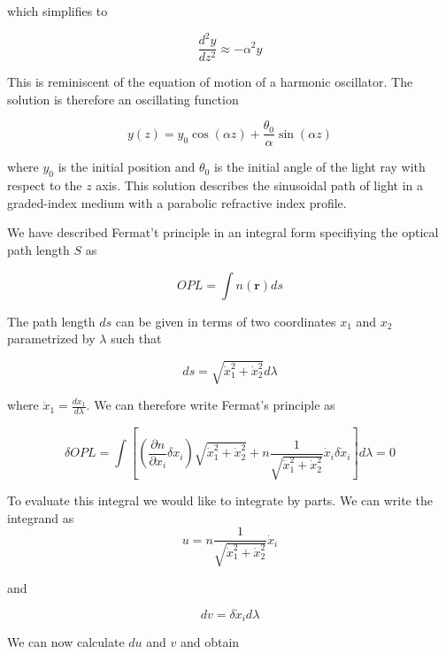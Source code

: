 \documentclass[
  a4paper,
]{book}
\begin{document}
\begin{tcolorbox}
which simplifies to

\[
\frac{d^2 y}{dz^2} \approx -\alpha^2 y
\]

This is reminiscent of the equation of motion of a harmonic oscillator.
The solution is therefore an oscillating function

\[
y(z)=y_0\cos(\alpha z)+\frac{\theta_0}{\alpha}\sin(\alpha z)
\]

where \(y_0\) is the initial position and \(\theta_0\) is the initial
angle of the light ray with respect to the \(z\) axis. This solution
describes the sinusoidal path of light in a graded-index medium with a
parabolic refractive index profile.

\end{tcolorbox}

\begin{tcolorbox}[enhanced jigsaw, breakable, toptitle=1mm, bottomrule=.15mm, colbacktitle=quarto-callout-tip-color!10!white, title=\textcolor{quarto-callout-tip-color}{\faLightbulb}\hspace{0.5em}{Fermat's Principle in Integral and Differential Form}, arc=.35mm, rightrule=.15mm, bottomtitle=1mm, opacityback=0, toprule=.15mm, coltitle=black, leftrule=.75mm, opacitybacktitle=0.6, colback=white, left=2mm, titlerule=0mm, colframe=quarto-callout-tip-color-frame]

We have described Fermat't principle in an integral form specifiying the
optical path length \(S\) as

\[
OPL=\int n(\textbf{r})ds
\]

The path length \(ds\) can be given in terms of two coordinates \(x_1\)
and \(x_2\) parametrized by \(\lambda\) such that

\[
ds=\sqrt{\dot{x}_1^{2}+\dot{x}_2^{2}}d\lambda
\]

where \(\dot{x}_1=\frac{dx_{1}}{d\lambda}\). We can therefore write
Fermat's principle as

\[
\delta OPL=\int\left[\left(\frac{\partial n}{\partial x_i} \delta x_i\right) \sqrt{\dot{x}_1^2+\dot{x}_2^2}+n \frac{1}{\sqrt{\dot{x}_1^2+\dot{x}_2^2}} \dot{x}_i \delta \dot{x}_i\right] d \lambda = 0
\]

To evaluate this integral we would like to integrate by parts. We can
write the integrand as \[
u = n \frac{1}{\sqrt{\dot{x}_1^2+\dot{x}_2^2}} \dot{x}_i
\]

and

\[
dv = \delta \dot{x}_i d\lambda
\]

We can now calculate \(du\) and \(v\) and obtain


\end{tcolorbox}
\end{document}
